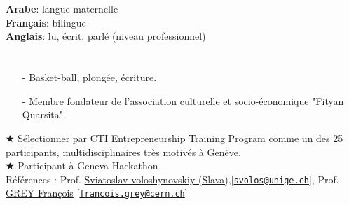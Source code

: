 \documentclass[a4paper,10pt]{article}
\begin{document}
\begin{minipage}[t]{0.45\textwidth}
\section{\Large{\selectfont{Langues}}}
\textbf{Arabe}: langue maternelle \\
\hspace{1cm}\textbf{Français}: bilingue\\
\hspace{1cm}\textbf{Anglais}: lu, \'ecrit, parl\'e (niveau professionnel)
\end{minipage}
\hfill
\begin{minipage}[t]{0.45\textwidth}
\section{\Large\selectfont{Activit\'es et loisirs}} 
\begin{itemize}
\item[\--] Basket-ball, plong\'ee, \'ecriture.
\item[\--] Membre fondateur de l'association culturelle et socio-\'economique "Fityan Quarsita".
\end{itemize}

\end{minipage}
$\bigstar $ S\'electionner par CTI Entrepreneurship Training Program comme un des 25 participants, multidisciplinaires tr\`es motiv\'es \`a Gen\`eve.\\
$\bigstar $ Participant \`a Geneva Hackathon\\
R\'ef\'erences : Prof. \href{http://sip.unige.ch/team/prof-sviatoslav-voloshynovskiy/}{Sviatoslav voloshynovskiy (Slava)},[\href{mailto:svolos@unige.ch}{\nolinkurl{svolos@unige.ch}}], Prof. \href{https://itp.nyu.edu/itp/people/people.php?id=3273&group=All}{GREY François} [\href{mailto:francois.grey@cern.ch }{\nolinkurl{francois.grey@cern.ch}}]




\end{document}
